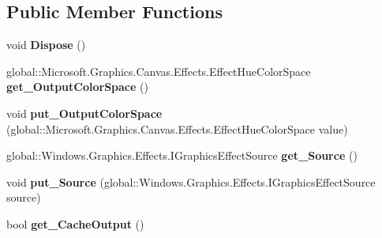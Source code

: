 \subsection*{Public Member Functions}
\begin{DoxyCompactItemize}
\item 
\mbox{\label{class_microsoft_1_1_graphics_1_1_canvas_1_1_effects_1_1_rgb_to_hue_effect_a1407f111a18559e8d864df81ceba280e}} 
void {\bfseries Dispose} ()
\item 
\mbox{\label{class_microsoft_1_1_graphics_1_1_canvas_1_1_effects_1_1_rgb_to_hue_effect_a40eb46a90aa97b3103b90cacbb167e8f}} 
global\+::\+Microsoft.\+Graphics.\+Canvas.\+Effects.\+Effect\+Hue\+Color\+Space {\bfseries get\+\_\+\+Output\+Color\+Space} ()
\item 
\mbox{\label{class_microsoft_1_1_graphics_1_1_canvas_1_1_effects_1_1_rgb_to_hue_effect_a7b46dafa8195822d71d060fa1d29d6cb}} 
void {\bfseries put\+\_\+\+Output\+Color\+Space} (global\+::\+Microsoft.\+Graphics.\+Canvas.\+Effects.\+Effect\+Hue\+Color\+Space value)
\item 
\mbox{\label{class_microsoft_1_1_graphics_1_1_canvas_1_1_effects_1_1_rgb_to_hue_effect_ac010096a9957ca0571bf12f3b4a45b10}} 
global\+::\+Windows.\+Graphics.\+Effects.\+I\+Graphics\+Effect\+Source {\bfseries get\+\_\+\+Source} ()
\item 
\mbox{\label{class_microsoft_1_1_graphics_1_1_canvas_1_1_effects_1_1_rgb_to_hue_effect_aff4c6b2331de6d5065bf56e89ef006b7}} 
void {\bfseries put\+\_\+\+Source} (global\+::\+Windows.\+Graphics.\+Effects.\+I\+Graphics\+Effect\+Source source)
\item 
\mbox{\label{class_microsoft_1_1_graphics_1_1_canvas_1_1_effects_1_1_rgb_to_hue_effect_ad49ad15514b7a28d8c0dba64ffd88feb}} 
bool {\bfseries get\+\_\+\+Cache\+Output} ()
\item 

\end{DoxyCompactItemize}
